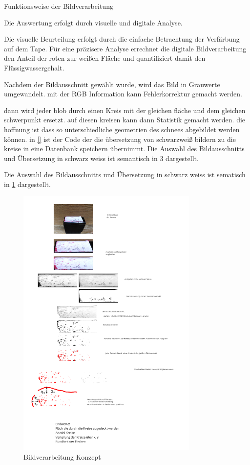 Funktionsweise der Bildverarbeitung


Die Auswertung erfolgt durch visuelle und digitale Analyse.

Die visuelle Beurteilung erfolgt durch die einfache Betrachtung der Verfärbung auf dem Tape. 
Für eine präzisere Analyse errechnet die digitale Bildverarbeitung den Anteil der roten zur weißen Fläche und quantifiziert damit den Flüssigwassergehalt.

Nachdem der Bildausschnitt gewählt wurde, wird das Bild in Grauwerte umgewandelt. mit der RGB Information kann Fehlerkorrektur gemacht werden.

dann wird jeder blob durch einen Kreis mit der gleichen fläche und dem gleichen schwerpunkt ersetzt. auf diesen kreisen kann dann Statistik gemacht werden. die hoffnung ist dass so unterschiedliche geometrien des schnees abgebildet werden können. in \ref{} ist der Code der die übersetzung von schwarzweiß bildern zu die kreise in eine Datenbank speichern übernimmt.
Die Auswahl des Bildausschnitts und Übersetzung in schwarz weiss ist semantisch in 3 dargestellt.



Die Auswahl des Bildausschnitts und Übersetzung in schwarz weiss ist sematisch in \ref{fig:Bildverarbeitnugskonzpet} dargestellt.


\begin{figure}
    \centering
    \includegraphics[width=0.8\textwidth]{Bilder/Screenshotfrom2024-04-0112-59-42.png}
    \caption{Bildverarbeitung Konzept}
    \label{fig:Bildverarbeitnugskonzpet}
\end{figure}

\newpage

